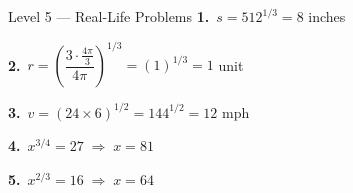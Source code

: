 \documentclass[12pt]{article}
\begin{document}
\begin{solutionbox}{Level 5 --- Real-Life Problems}
\textbf{1.}~$s=512^{1/3}=8$ inches

\textbf{2.}~$r=\left(\dfrac{3\cdot\frac{4\pi}{3}}{4\pi}\right)^{1/3}=(1)^{1/3}=1$ unit

\textbf{3.}~$v=(24\times6)^{1/2}=144^{1/2}=12$ mph

\textbf{4.}~$x^{3/4}=27\;\Rightarrow\;x=81$

\textbf{5.}~$x^{2/3}=16\;\Rightarrow\;x=64$
\end{solutionbox}
\end{document}
